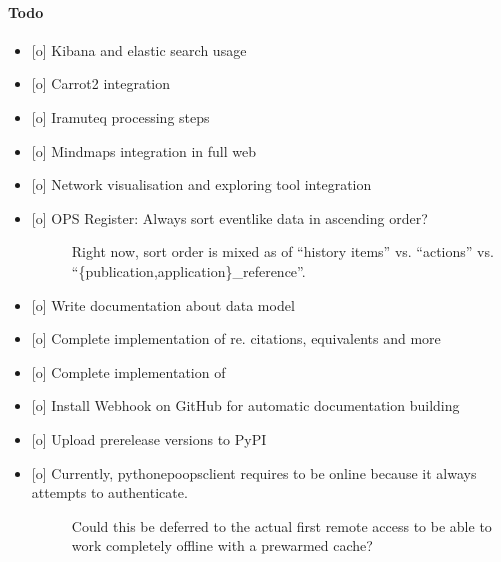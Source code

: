 \documentclass[letterpaper,10pt,english]{sphinxmanual}
\begin{document}
\paragraph{Todo}
\label{\detokenize{todo:todo}}\begin{itemize}
\item {} 
{[}o{]} Kibana and elastic search usage

\item {} 
{[}o{]} Carrot2 integration

\item {} 
{[}o{]} Iramuteq processing steps

\item {} 
{[}o{]} Mindmaps integration in full web

\item {} 
{[}o{]} Network visualisation and exploring tool integration

\item {} \begin{description}
\item[{{[}o{]} OPS Register: Always sort event\sphinxhyphen{}like data in ascending order?}] \leavevmode
Right now, sort order is mixed as of “history items” vs. “actions” vs. “\{publication,application\}\_reference”.

\end{description}

\item {} 
{[}o{]} Write documentation about data model

\item {} 
{[}o{]} Complete implementation of  re. citations, equivalents and more

\item {} 
{[}o{]} Complete implementation of 

\item {} 
{[}o{]} Install Webhook on GitHub for automatic documentation building

\item {} 
{[}o{]} Upload pre\sphinxhyphen{}release versions to PyPI

\item {} \begin{description}
\item[{{[}o{]} Currently, python\sphinxhyphen{}epo\sphinxhyphen{}ops\sphinxhyphen{}client requires to be online because it always attempts to authenticate.}] \leavevmode
Could this be deferred to the actual first remote access to be able to work completely offline with a prewarmed cache?


\end{description}
\end{itemize}
\end{document}
